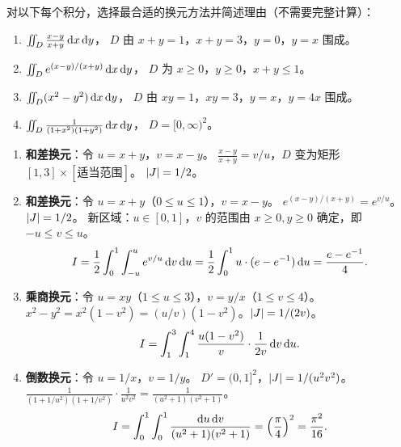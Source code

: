 \documentclass{ctexart}
\begin{document}
\begin{exercise}[综合——设计换元方案]
  对以下每个积分，选择最合适的换元方法并简述理由（不需要完整计算）：
  \begin{enumerate}
    \item $\iint_D \frac{x-y}{x+y}\,\mathrm{d} x\,\mathrm{d} y$，
      $D$ 由 $x+y=1$，$x+y=3$，$y=0$，$y=x$ 围成。
    \item $\iint_D e^{(x-y)/(x+y)}\,\mathrm{d} x\,\mathrm{d} y$，
      $D$ 为 $x \ge 0$，$y \ge 0$，$x+y \le 1$。
    \item $\iint_D (x^2-y^2)\,\mathrm{d} x\,\mathrm{d} y$，
      $D$ 由 $xy=1$，$xy=3$，$y=x$，$y=4x$ 围成。
    \item $\iint_D \frac{1}{(1+x^2)(1+y^2)}\,\mathrm{d} x\,\mathrm{d} y$，
      $D = [0,\infty)^2$。
  \end{enumerate}
\end{exercise}

\begin{solution}
  \begin{enumerate}
    \item \textbf{和差换元}：令 $u = x+y$，$v = x-y$。
      $\frac{x-y}{x+y} = v/u$，$D$ 变为矩形 $[1,3]\times[\text{适当范围}]$。
      $\left| J \right| = 1/2$。

    \item \textbf{和差换元}：令 $u = x+y$（$0 \le u \le 1$），$v = x-y$。
      $e^{(x-y)/(x+y)} = e^{v/u}$。$\left| J \right| = 1/2$。
      新区域：$u \in [0,1]$，$v$ 的范围由 $x \ge 0, y \ge 0$ 确定，即 $-u \le v \le u$。
      \[
        I = \frac{1}{2}\int_0^1\int_{-u}^{u} e^{v/u}\,\mathrm{d} v\,\mathrm{d} u
        = \frac{1}{2}\int_0^1 u\cdot(e-e^{-1})\,\mathrm{d} u
        = \frac{e-e^{-1}}{4}.
      \]

    \item \textbf{乘商换元}：令 $u = xy$（$1 \le u \le 3$），$v = y/x$（$1 \le v \le 4$）。
      $x^2 - y^2 = x^2(1 - v^2) = (u/v)(1-v^2)$。$\left| J \right| = 1/(2v)$。
      \[
        I = \int_1^3\int_1^4 \frac{u(1-v^2)}{v}\cdot\frac{1}{2v}\,\mathrm{d} v\,\mathrm{d} u.
      \]

    \item \textbf{倒数换元}：令 $u = 1/x$，$v = 1/y$。
      $D' = (0,1]^2$，$\left| J \right| = 1/(u^2 v^2)$。
      $\frac{1}{(1+1/u^2)(1+1/v^2)}\cdot\frac{1}{u^2 v^2}
      = \frac{1}{(u^2+1)(v^2+1)}$。
      \[
        I = \int_0^1\int_0^1 \frac{\mathrm{d} u\,\mathrm{d} v}{(u^2+1)(v^2+1)}
        = \left(\frac{\pi}{4}\right)^2 = \frac{\pi^2}{16}.
      \]
  \end{enumerate}
\end{solution}
\end{document}
